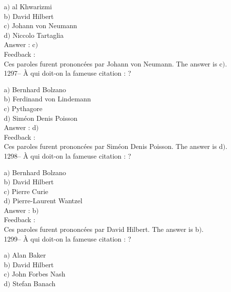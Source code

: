 ﻿\documentclass[letterpaper, 12pt]{article}
\begin{document}
a$)$ al Khwarizmi \\
b$)$ David Hilbert \\
c$)$ Johann von Neumann \\
d$)$ Niccolo Tartaglia\\

Answer : c$)$\\

Feedback : \\
Ces paroles furent prononc\'ees par Johann von Neumann.
The answer is  c$)$.\\

1297-- \`A qui doit-on la fameuse citation : \fg ?

a$)$ Bernhard Bolzano \\
b$)$ Ferdinand von Lindemann \\
c$)$ Pythagore \\
d$)$ Sim\'eon Denis Poisson\\

Answer : d$)$\\

Feedback : \\
Ces paroles furent prononc\'ees par Sim\'eon Denis Poisson.
The answer is  d$)$.\\

1298-- \`A qui doit-on la fameuse citation : \fg ?

a$)$ Bernhard Bolzano \\
b$)$ David Hilbert \\
c$)$ Pierre Curie \\
d$)$ Pierre-Laurent Wantzel\\

Answer : b$)$\\

Feedback : \\
Ces paroles furent prononc\'ees par David Hilbert.
The answer is  b$)$.\\

1299-- \`A qui doit-on la fameuse citation : \fg?

a$)$ Alan Baker \\
b$)$ David Hilbert \\
c$)$ John Forbes Nash \\
d$)$ Stefan Banach\\
\end{document}
